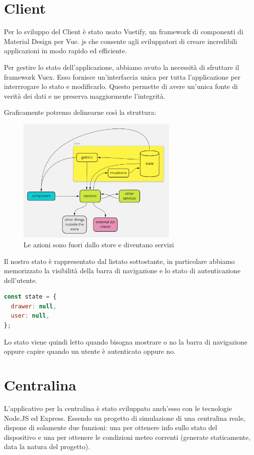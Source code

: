 \section{Client}
Per lo sviluppo del Client è stato usato Vuetify, un framework di componenti di Material Design per Vue. js che consente agli sviluppatori di creare incredibili applicazioni in modo rapido ed efficiente.

Per gestire lo stato dell'applicazione, abbiamo avuto la necessità di sfruttare il framework Vuex. Esso fornisce un'interfaccia unica per tutta l'applicazione per interrrogare lo stato e modificarlo. Questo permette di avere un'unica fonte di verità dei dati e ne preserva maggiormente l'integrità.

Graficamente potremo delinearne così la struttura:
\begin{figure}[H]
    \caption{Le azioni sono fuori dallo store e diventano servizi}
    \label{fig:Store}
    \centering
    \includegraphics[width=0.7\textwidth]{Images/store.png}
\end{figure}

Il nostro stato è rappresentato dal listato sottostante, in particolare abbiamo memorizzato la visibilità della barra di navigazione e lo stato di autenticazione dell'utente.

\begin{lstlisting}[language=Javascript]
const state = {
  drawer: null,
  user: null,
};
\end{lstlisting}

Lo stato viene quindi letto quando bisogna mostrare o no la barra di navigazione oppure capire quando un utente è autenticato oppure no.

\section{Centralina}
L'applicativo per la centralina è stato sviluppato anch'esso con le tecnologie Node.JS ed Express. Essendo un progetto di simulazione di una centralina reale, dispone di solamente due funzioni: una per ottenere info sullo stato del dispositivo e una per ottenere le condizioni meteo correnti (generate staticamente, data la natura del progetto).

